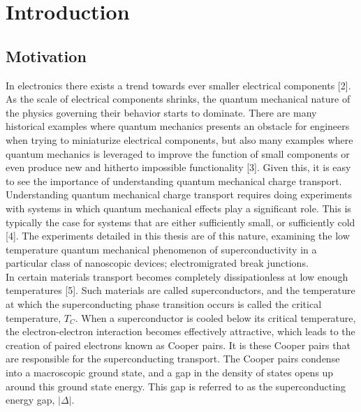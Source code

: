 \section{Introduction}
\subsection{Motivation}







In electronics there exists a trend towards ever smaller electrical components [2]. As the scale of electrical components shrinks, the quantum mechanical nature of the physics governing their behavior starts to dominate. There are many historical examples where quantum mechanics presents an obstacle for engineers when trying to miniaturize electrical components, but also many examples where quantum mechanics is leveraged to improve the function of small components or even produce new and hitherto impossible functionality [3]. Given this, it is easy to see the importance of understanding quantum mechanical charge transport. Understanding quantum mechanical charge transport requires doing experiments with systems in which quantum mechanical effects play a significant role. This is typically the case for systems that are either sufficiently small, or sufficiently cold [4]. The experiments detailed in this thesis are of this nature, examining the low temperature quantum mechanical phenomenon of superconductivity in a particular class of nanoscopic devices; electromigrated break junctions. \\


In certain materials transport becomes completely dissipationless at low enough temperatures [5]. Such materials are called superconductors, and the temperature at which the superconducting phase transition occurs is called the critical temperature, $T_C$. When a superconductor is cooled below its critical temperature, the electron-electron interaction becomes effectively attractive, which leads to the creation of paired electrons known as Cooper pairs. It is these Cooper pairs that are responsible for the superconducting transport. The Cooper pairs condense into a macroscopic ground state, and a gap in the density of states opens up around this ground state energy. This gap is referred to as the superconducting energy gap, $|\Delta|$.

